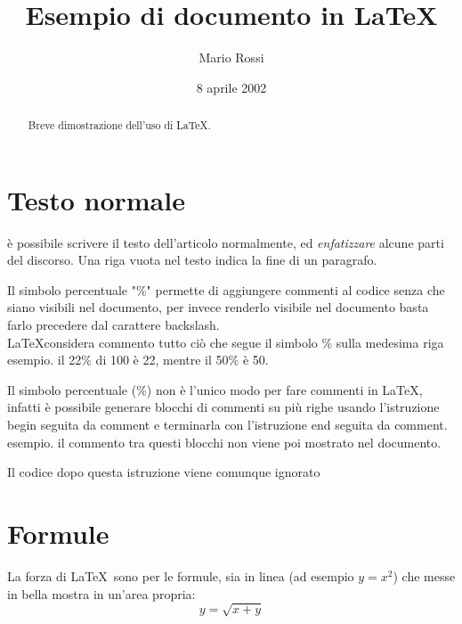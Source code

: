 \documentclass[a4paper,12pt]{article} %
\title {Esempio di documento in \LaTeX} %
\author{Mario Rossi}
\date {8 aprile 2002}
\begin{document}
\maketitle %

\begin{abstract} %
	Breve dimostrazione dell'uso di \LaTeX.
\end{abstract} %

\tableofcontents %

\section{Testo normale} %
è possibile scrivere il testo dell'articolo normalmente, ed \emph{enfatizzare} alcune parti del discorso. %
Una riga vuota nel testo indica la fine di un paragrafo.


Il simbolo percentuale "\%" permette di aggiungere commenti al codice senza che siano visibili nel documento, per invece renderlo visibile nel documento basta farlo precedere dal carattere backslash.
\\ \LaTeX considera commento tutto ciò che segue il simbolo \% sulla medesima riga
\\ esempio. il 22\% di 100 è 22, mentre il 50\% è 50. %
%

Il simbolo percentuale (\%) non è l'unico modo per fare commenti in \LaTeX, infatti è possibile generare blocchi di commenti su più righe usando l'istruzione begin seguita da {comment} e terminarla con l'istruzione end seguita da {comment}.
\\ esempio. il commento tra questi blocchi non viene poi mostrato nel documento. \begin{comment} codice all'interno dell'ambiente commento
riga commento 1
riga commento 2
riga commento 3
\end{comment} Il codice dopo questa istruzione viene comunque ignorato

\section{Formule} %
La forza di \LaTeX\ sono per le formule, sia in linea (ad esempio \(y=x^2\)) che messe in bella mostra in un'area propria: \[y=\sqrt{x+y}\]
\end{document}
